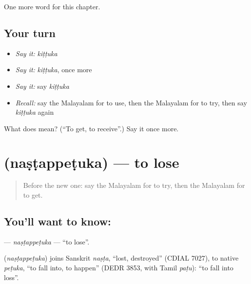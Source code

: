 \begin{grammarlens}[title={What you've built}]
One more word for this chapter.
\end{grammarlens}

\subsection*{Your turn}
\begin{itemize}
\raggedright
  \item \emph{Say it:} \emph{kiṭṭuka}
  \item \emph{Say it:} \emph{kiṭṭuka}, once more
  \item \emph{Say it:} say \emph{kiṭṭuka}
  \item \emph{Recall:} say the Malayalam for to use, then the Malayalam for to try, then say \emph{kiṭṭuka} again
\end{itemize}

\begin{tcolorbox}[breakable,colback=teal!4,colframe=teal!35!black,title={Before you move on}]
What does  mean? (\textquotedblleft{}To get, to receive\textquotedblright{}.) Say it once more.
\end{tcolorbox}
\section[\texorpdfstring{\ml{നഷ്ടപ്പെടുക} (naṣṭappeṭuka)}{നഷ്ടപ്പെടുക (naṣṭappeṭuka)}]{ (naṣṭappeṭuka) — to lose}

\label{lesson:ML-C183-nastappetuka}



\begin{quote}
Before the new one: say the Malayalam for to try, then the Malayalam for to get.
\end{quote}

\subsection*{You'll want to know: }
\textbf{} — \emph{naṣṭappeṭuka} — \textquotedblleft{}to lose\textquotedblright{}.

\begin{cousinweb}
\textbf{} (\emph{naṣṭappeṭuka}) joins Sanskrit \emph{naṣṭa}, \textquotedblleft{}lost, destroyed\textquotedblright{} (CDIAL 7027), to native \emph{peṭuka}, \textquotedblleft{}to fall into, to happen\textquotedblright{} (DEDR 3853, with Tamil \emph{paṭu}): \textquotedblleft{}to fall into loss\textquotedblright{}.
\end{cousinweb}

